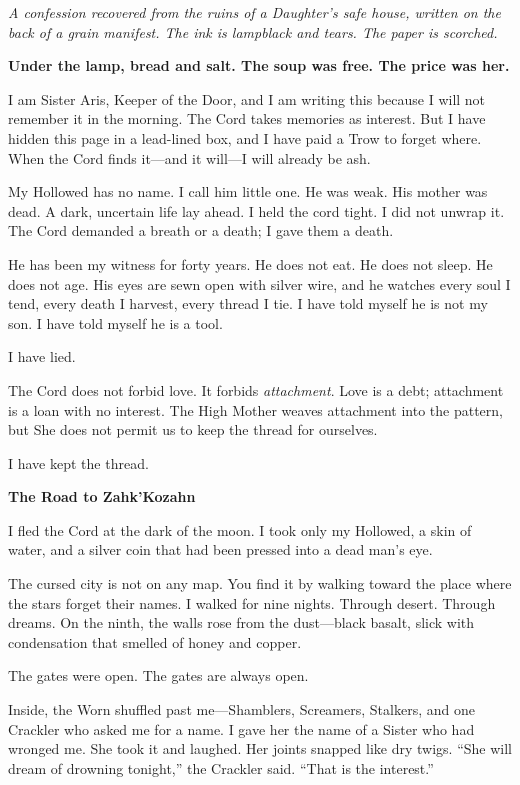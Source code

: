 \documentclass[11pt]{article}
\newenvironment{founddocument}{%
  \begin{mdframed}[backgroundcolor=horrorbg, linecolor=bloodcolor, linewidth=1pt, leftmargin=0.5cm, rightmargin=0.5cm]
  \setlength{\parskip}{0.8em}
}{%
  \end{mdframed}
}
\begin{document}
\begin{founddocument}
\noindent
\emph{A confession recovered from the ruins of a Daughter's safe house, written on the back of a grain manifest. The ink is lampblack and tears. The paper is scorched.}

\vspace{1em}
\noindent
\textbf{Under the lamp, bread and salt. The soup was free. The price was her.}

I am Sister Aris, Keeper of the Door, and I am writing this because I will not remember it in the morning. The Cord takes memories as interest. But I have hidden this page in a lead-lined box, and I have paid a Trow to forget where. When the Cord finds it---and it will---I will already be ash.

My Hollowed has no name. I call him little one. He was weak. His mother was dead. A dark, uncertain life lay ahead. I held the cord tight. I did not unwrap it. The Cord demanded a breath or a death; I gave them a death.

He has been my witness for forty years. He does not eat. He does not sleep. He does not age. His eyes are sewn open with silver wire, and he watches every soul I tend, every death I harvest, every thread I tie. I have told myself he is not my son. I have told myself he is a tool.

I have lied.

The Cord does not forbid love. It forbids \emph{attachment}. Love is a debt; attachment is a loan with no interest. The High Mother weaves attachment into the pattern, but She does not permit us to keep the thread for ourselves.

I have kept the thread.

\vspace{1em}
\noindent
\textbf{The Road to Zahk'Kozahn}

I fled the Cord at the dark of the moon. I took only my Hollowed, a skin of water, and a silver coin that had been pressed into a dead man's eye.

The cursed city is not on any map. You find it by walking toward the place where the stars forget their names. I walked for nine nights. Through desert. Through dreams. On the ninth, the walls rose from the dust---black basalt, slick with condensation that smelled of honey and copper.

The gates were open. The gates are always open.

Inside, the Worn shuffled past me---Shamblers, Screamers, Stalkers, and one Crackler who asked me for a name. I gave her the name of a Sister who had wronged me. She took it and laughed. Her joints snapped like dry twigs. ``She will dream of drowning tonight,'' the Crackler said. ``That is the interest.''


\end{founddocument}
\end{document}
